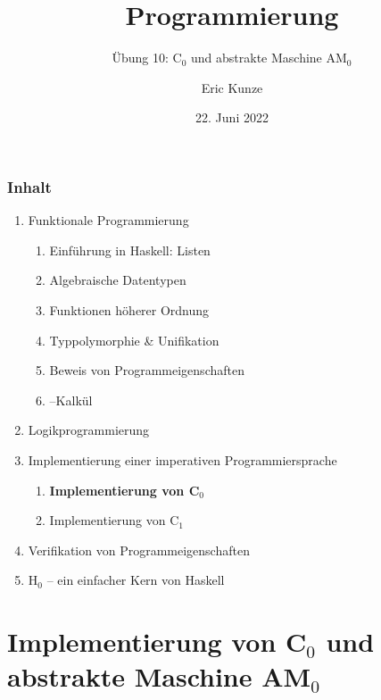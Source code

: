 \documentclass{beamer}
\begin{document}
	
	\title{Programmierung}
	\subtitle{Übung 10: C${}_\text{0}$ und abstrakte Maschine AM${}_\text{0}$}
	\author{Eric Kunze}
	\date{22. Juni 2022}
	
	\maketitle
	


\begin{frame}[fragile] \frametitle{Inhalt}
	\begin{enumerate}
		\item Funktionale Programmierung
		\begin{enumerate}
			\item Einführung in Haskell: Listen
			\item Algebraische Datentypen
			\item Funktionen höherer Ordnung
			\item Typpolymorphie \& Unifikation
			\item Beweis von Programmeigenschaften
			\item \textlambda--Kalkül
		\end{enumerate}
		\item Logikprogrammierung
		\item Implementierung einer imperativen Programmiersprache
		\begin{enumerate}
			\item \textbf{Implementierung von C${}_\text{0}$}
			\item Implementierung von C${}_\text{1}$
		\end{enumerate}
		\item Verifikation von Programmeigenschaften
		\item H${}_\text{0}$ -- ein einfacher Kern von Haskell
	\end{enumerate}
\end{frame}



\section{Implementierung von C${}_\text{0}$ und abstrakte Maschine AM${}_\text{0}$}
\end{document}

